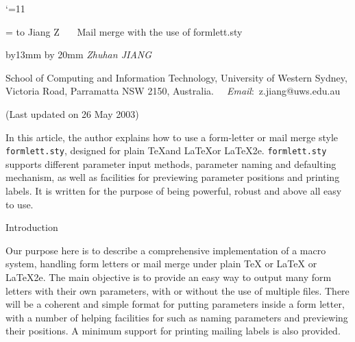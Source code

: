 {%
%
%




\catcode`\@=11\relax
{}
\voffset=-0.3in


\ifx\pageno\undefined
{}
\fi


\parindent=0pt
\hsize=469.75499pt  %
\vsize=9.6in %

\def\makefootline{\baselineskip=24pt \line{\the\footline}}
\footline={
\hbox to \hsize
 {{\tenrm Jiang Z ~~~{\tensl Mail merge with the use of formlett.sty}
\hss \folio}}}

\bigskip


{\advance\leftskip by13mm \overfullrule=0pt
\advance\rightskip by 20mm %
\sl
\noindent Zhuhan JIANG\par
\noindent School of Computing and Information Technology,
 University of Western Sydney, Victoria Road, Parramatta NSW 2150, Australia.
{\sl ~~Email}:~z.jiang@uws.edu.au\par
\medskip
\rm\smooth
\noindent (Last updated on 26 May 2003)\par
\medskip

\noindent
In this article, the author explains how to use a form-letter or mail
merge style {\tt formlett.sty}, designed for plain \TeX\space and
\LaTeX\space or \LaTeX2e. {\tt formlett.sty} supports different
parameter input methods, parameter naming and defaulting mechanism, as
well as facilities for previewing parameter positions and printing
labels. It is written for the purpose of being powerful, robust and
above all easy to use.\par }


\begincolumns

{\lbold Introduction}

\smallskip

Our purpose here is to describe a comprehensive implementation of a
macro system, handling form letters or mail merge under plain \TeX\space
or \LaTeX{} or \LaTeX2e. The main objective is to provide an
easy way to output many form letters with their own parameters, with or
without the use of multiple files. There will be a coherent and simple
format for putting parameters inside a form letter, with a number of
helping facilities for such as naming parameters and previewing their
positions. A minimum support for printing mailing labels is also
provided.


}
